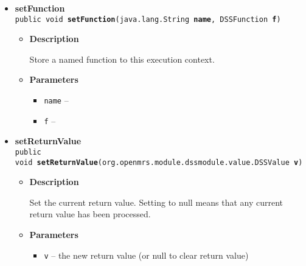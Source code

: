 {{{{\begin{itemize}
{\begin{itemize}
{Associate a value with a variable name. Any previously-defined value for that name in the current execution scope will be overwritten.
}
\item{
{\bf  Parameters}
  \begin{itemize}
   \item{
\texttt{name} -- }
   \item{
\texttt{value} -- }
  \end{itemize}
}%
\end{itemize}
}%
\item{ 
\hypertarget{org.openmrs.module.dssmodule.state.ExecutionContext.setFunction(java.lang.String, org.openmrs.module.dssmodule.state.DSSFunction)}{{\bf  setFunction}\\}
\texttt{public void\ {\bf  setFunction}(\texttt{java.lang.String} {\bf  name},
\texttt{DSSFunction} {\bf  f})
\label{org.openmrs.module.dssmodule.state.ExecutionContext.setFunction(java.lang.String, org.openmrs.module.dssmodule.state.DSSFunction)}}%
\begin{itemize}
\item{
{\bf  Description}

Store a named function to this execution context.
}
\item{
{\bf  Parameters}
  \begin{itemize}
   \item{
\texttt{name} -- }
   \item{
\texttt{f} -- }
  \end{itemize}
}%
\end{itemize}
}%
\item{ 
\hypertarget{org.openmrs.module.dssmodule.state.ExecutionContext.setReturnValue(org.openmrs.module.dssmodule.value.DSSValue)}{{\bf  setReturnValue}\\}
\texttt{public void\ {\bf  setReturnValue}(\texttt{org.openmrs.module.dssmodule.value.DSSValue} {\bf  v})
\label{org.openmrs.module.dssmodule.state.ExecutionContext.setReturnValue(org.openmrs.module.dssmodule.value.DSSValue)}}%
\begin{itemize}
\item{
{\bf  Description}

Set the current return value. Setting to null means that any current return value has been processed.
}
\item{
{\bf  Parameters}
  \begin{itemize}
   \item{
\texttt{v} -- the new return value (or null to clear return value)}
  \end{itemize}
}%
\end{itemize}
}%
\end{itemize}
}
}
}
}

